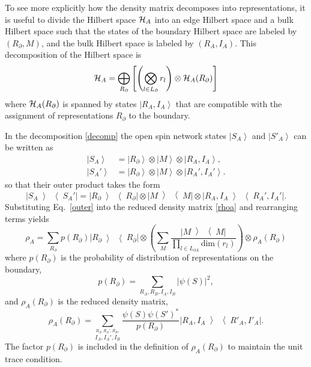 \documentclass[aps,prd,twocolumn,showpacs,groupedaddress,nofootinbib,letterpaper]{revtex4}
\newcommand{\ket}[1]{\left\vert#1\right\rangle}
\newcommand{\ketbra}[2]{\left|#1\middle\rangle \! \middle\langle#2\right|}
\begin{document}
To see more explicitly how the density matrix decomposes into representations, it is useful to divide the Hilbert space ${\cal H}_A$ into an edge Hilbert space and a bulk Hilbert space such that the states of the boundary Hilbert space are labeled by $(R_{\partial}, M)$, and the bulk Hilbert space is labeled by $(R_A, I_A)$.
This decomposition of the Hilbert space is
\begin{equation} \label{decomp}
{\cal H}_A = \bigoplus_{R_{\partial}} \left[ 
\left( \bigotimes_{l \in L_{\partial}} r_l \right) \otimes
{\cal H}_A(R_{\partial})
\right]
\end{equation}
where ${\cal H}_A(R_{\partial})$ is spanned by states $\ket{R_A, I_A}$ that are compatible with the assignment of representations $R_{\partial}$ to the boundary.

In the decomposition \eqref{decomp} the open spin network states $\ket{S_A}$ and $\ket{S'_A}$ can be written as
\begin{eqnarray}
\ket{S_A} &= \ket{R_{\partial}} \otimes \ket{M} \otimes \ket{R_A,I_A}, \\
\ket{S_A'} &= \ket{R_{\partial}} \otimes \ket{M} \otimes \ket{R_A',I_A'}.
\end{eqnarray}
so that their outer product takes the form
\begin{equation} \label{outer}
\ketbra{S_A}{S_A'} = \ketbra{R_{\partial}}{R_{\partial}} \otimes \ketbra{M}{M} \otimes \ketbra{R_A,I_A}{R_A',I_A'}.
\end{equation}
Substituting Eq.~\eqref{outer} into the reduced density matrix \eqref{rhoa} and rearranging terms yields
\begin{equation} \label{rhoa2}
\rho_A = \sum_{R_{\partial}} p(R_{\partial}) \ketbra{R_{\partial}} {R_{\partial}} 
\otimes \left( \sum_M \frac{\ketbra{M}{M}}{\prod_{l \in L_{\partial A}} \text{dim}(r_l) } \right) 
\otimes \rho_A(R_\partial)
\end{equation}
where $p(R_{\partial})$ is the probability of distribution of representations on the boundary,
\begin{equation}
p(R_{\partial}) = \sum_{R_A,R_B, I_A, I_B} \left| \psi(S) \right|^2,
\end{equation}
and $\rho_A(R_{\partial})$ is the reduced density matrix,
\begin{equation}
\rho_A(R_{\partial}) = 
\sum_{\stackrel{R_A, R_A', R_B,}{I_A, I_A', I_B}} 
\frac{\psi(S) \psi(S')^*}{p(R_{\partial})}
\ketbra{R_A, I_A}{R'_A, I'_A}.
\end{equation}
The factor $p(R_{\partial})$ is included in the definition of $\rho_A(R_{\partial})$ to maintain the unit trace condition.
\end{document}
